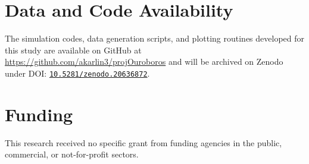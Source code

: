\documentclass[review,3p,times]{elsarticle}
\newcommand{\zenododoi}{10.5281/zenodo.20636872}
\begin{document}
\section*{Data and Code Availability}
The simulation codes, data generation scripts, and plotting routines developed for this study are available on GitHub at \url{https://github.com/akarlin3/projOuroboros} and will be archived on Zenodo under DOI: \href{https://doi.org/\zenododoi}{\texttt{\zenododoi}}.

\section*{Funding}
This research received no specific grant from funding agencies in the public, commercial, or not-for-profit sectors.



\end{document}
